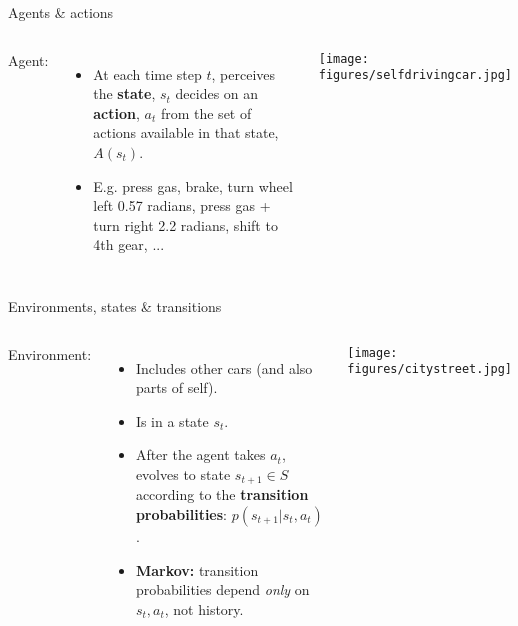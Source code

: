\documentclass{beamer}
\begin{document}
\begin{frame}{Agents \& actions}
\begin{columns}
Agent:
\begin{itemize}
    \item At each time step \(t\), perceives the \textbf{state}, \(s_t\) decides on an \textbf{action}, \(a_t\) from the set of actions available in that state, \(A(s_t)\).
    \item<2-> E.g. press gas, brake, turn wheel left 0.57 radians, press gas + turn right 2.2 radians, shift to 4th gear, ...
\end{itemize}
    \begin{center}
    \texttt{[image: figures/selfdrivingcar.jpg]}
    \end{center}
\end{columns}
\end{frame}

\begin{frame}{Environments, states \& transitions}
\begin{columns}
Environment:
\begin{itemize}
    \item Includes other cars (and also parts of self).
    \item<2-> Is in a state \(s_t\). 
    \item<3-> After the agent takes \(a_t\), evolves to state \(s_{t+1} \in S\) according to the \textbf{transition probabilities}: \(p(s_{t+1} | s_t, a_t)\).
    \item<4-> \textbf{Markov:} transition probabilities depend \emph{only} on \(s_t, a_t\), not history. 
\end{itemize}
    \begin{center}
    \texttt{[image: figures/citystreet.jpg]}
    \end{center}
\end{columns}
\end{frame}
\end{document}
